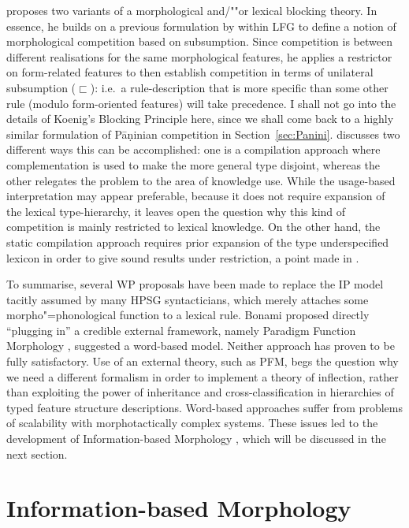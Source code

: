 \documentclass[output=paper
 	        ,biblatex
                ,babelshorthands
                ,newtxmath
                ,draftmode
                ,colorlinks, citecolor=brown
]{langscibook}
\begin{document}
\begin{exe}
\begin{xlist}
\citet{Koenig99} proposes two variants of a morphological and/""or
lexical blocking theory. In essence, he builds on a previous
formulation by \citet{Andrews90} within LFG to define a notion of
morphological competition based on subsumption. Since competition is
between different realisations for the same morphological features, he
applies a restrictor on form-related features to then establish
competition in terms of unilateral subsumption ($\sqsubset$): i.e.\ a
rule-description that is more specific than some other rule (modulo
form-oriented features) will take precedence. I shall not go into the
details of Koenig's Blocking Principle here, since we shall come back
to a highly similar formulation of Pāṇinian competition in
Section~\ref{sec:Panini}.  \citet{Koenig99} discusses two different
ways this can be accomplished: one is a compilation approach where
complementation is used to make the more general type disjoint,
whereas the other relegates the problem to the area of knowledge
use. While the usage-based interpretation may appear preferable,
because it does not require expansion of the lexical type-hierarchy,
it leaves open the question why this kind of competition is mainly
restricted to lexical knowledge. On the other hand, the static
compilation approach requires prior expansion of the type
underspecified lexicon in order to give sound results under
restriction, a point made in \citet{crysmann_b03book}.

To summarise, several WP proposals have been made to
replace the IP model tacitly assumed by many HPSG syntacticians, which
merely attaches some morpho"=phonological function to a lexical rule.
Bonami \citep{Bonami08f,Bonami06,Bonami07e,Bonami11f} proposed 
directly ``plugging in'' a credible external framework, namely Paradigm
Function Morphology \citep{Stump01}, \citet{Koenig99} suggested a
word-based model. Neither approach has proven to be fully
satisfactory. Use of an external theory, such as PFM, begs
the question why we need a different formalism in order to implement a
theory of inflection, rather than exploiting the power of inheritance and
cross-classification in hierarchies of typed feature structure
descriptions. Word-based approaches suffer from problems of
scalability with morphotactically complex systems.  These issues led
to the development of Information-based Morphology
\citep{Crysmann:Bonami:2016}, which will be discussed in the next
section.


\section{Information-based Morphology}
\label{sec:IbM}


\end{xlist}
\end{exe}
\end{document}
